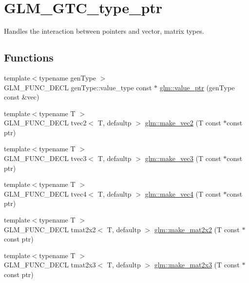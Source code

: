 \hypertarget{group__gtc__type__ptr}{}\section{G\+L\+M\+\_\+\+G\+T\+C\+\_\+type\+\_\+ptr}
\label{group__gtc__type__ptr}


Handles the interaction between pointers and vector, matrix types.  


\subsection*{Functions}
\begin{DoxyCompactItemize}
\item 
{\footnotesize template$<$typename gen\+Type $>$ }\\G\+L\+M\+\_\+\+F\+U\+N\+C\+\_\+\+D\+E\+C\+L gen\+Type\+::value\+\_\+type const $\ast$ \hyperlink{group__gtc__type__ptr_gaf019636bb8bd7c9efb7c7ce3bb23bcfc}{glm\+::value\+\_\+ptr} (gen\+Type const \&vec)
\item 
{\footnotesize template$<$typename T $>$ }\\G\+L\+M\+\_\+\+F\+U\+N\+C\+\_\+\+D\+E\+C\+L tvec2$<$ T, defaultp $>$ \hyperlink{group__gtc__type__ptr_ga5f7393c30970c5949be13ceb525093a6}{glm\+::make\+\_\+vec2} (T const $\ast$const ptr)
\item 
{\footnotesize template$<$typename T $>$ }\\G\+L\+M\+\_\+\+F\+U\+N\+C\+\_\+\+D\+E\+C\+L tvec3$<$ T, defaultp $>$ \hyperlink{group__gtc__type__ptr_ga86f4bc63570db86346db2e567fb760f6}{glm\+::make\+\_\+vec3} (T const $\ast$const ptr)
\item 
{\footnotesize template$<$typename T $>$ }\\G\+L\+M\+\_\+\+F\+U\+N\+C\+\_\+\+D\+E\+C\+L tvec4$<$ T, defaultp $>$ \hyperlink{group__gtc__type__ptr_ga152345176b8951c15711f6ed4f6fc237}{glm\+::make\+\_\+vec4} (T const $\ast$const ptr)
\item 
{\footnotesize template$<$typename T $>$ }\\G\+L\+M\+\_\+\+F\+U\+N\+C\+\_\+\+D\+E\+C\+L tmat2x2$<$ T, defaultp $>$ \hyperlink{group__gtc__type__ptr_gadb29e510762e1042069cb28bf24ae990}{glm\+::make\+\_\+mat2x2} (T const $\ast$const ptr)
\item 
{\footnotesize template$<$typename T $>$ }\\G\+L\+M\+\_\+\+F\+U\+N\+C\+\_\+\+D\+E\+C\+L tmat2x3$<$ T, defaultp $>$ \hyperlink{group__gtc__type__ptr_ga37988c6dd941f617cdfab86d54375fc1}{glm\+::make\+\_\+mat2x3} (T const $\ast$const ptr)

\end{DoxyCompactItemize}
